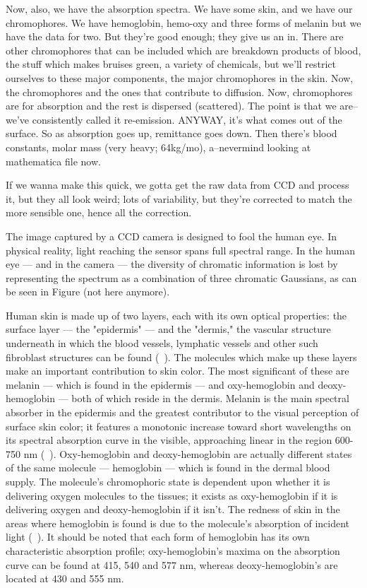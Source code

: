 Now, also, we have the absorption spectra. We have some skin, and we have our chromophores. We have hemoglobin, hemo-oxy and three forms of melanin but we have the data for two. But they're good enough; they give us an in. There are other chromophores that can be included which are breakdown products of blood, the stuff which makes bruises green, a variety of chemicals, but we'll restrict ourselves to these major components, the major chromophores in the skin. Now, the chromophores and the ones that contribute to diffusion. Now, chromophores are for absorption and the rest is dispersed (scattered). The point is that we are--we've consistently called it re-emission. ANYWAY, it's what comes out of the surface. So as absorption goes up, remittance goes down. Then there's blood constants, molar mass (very heavy; 64kg/mo), a--nevermind looking at mathematica file now.

If we wanna make this quick, we gotta get the raw data from CCD and process it, but they all look weird; lots of variability, but they're corrected to match the more sensible one, hence all the correction.




The image captured by a CCD camera is designed to fool the human eye. In physical reality, light reaching the sensor spans full spectral range. In the human eye --- and in the camera --- the diversity of chromatic information is lost by representing the spectrum as a combination of three chromatic Gaussians, as can be seen in Figure (not here anymore).


Human skin is made up of two layers, each with its own optical properties: the surface layer --- the "epidermis" --- and the "dermis," the vascular structure underneath in which the blood vessels, lymphatic vessels and other such fibroblast structures can be found (~\cite{Stamatas2004}). The molecules which make up these layers make an important contribution to skin color. The most significant of these are melanin --- which is found in the epidermis --- and oxy-hemoglobin and deoxy-hemoglobin --- both of which reside in the dermis. Melanin is the main spectral absorber in the epidermis and the greatest contributor to the visual perception of surface skin color; it features a monotonic increase toward short wavelengths on its spectral absorption curve in the visible, approaching linear in the region 600-750 nm (~\cite{Stamatas2004,Kollias1995,Zonios2001}). Oxy-hemoglobin and deoxy-hemoglobin are actually different states of the same molecule --- hemoglobin --- which is found in the dermal blood supply. The molecule's chromophoric state is dependent upon whether it is delivering oxygen molecules to the tissues; it exists as oxy-hemoglobin if it is delivering oxygen and deoxy-hemoglobin if it isn't. The redness of skin in the areas where hemoglobin is found is due to the molecule's absorption of incident light (~\cite{Kollias1995}). It should be noted that each form of hemoglobin has its own characteristic absorption profile; oxy-hemoglobin's maxima on the absorption curve can be found at 415, 540 and 577 nm, whereas deoxy-hemoglobin's are located at 430 and 555 nm.

